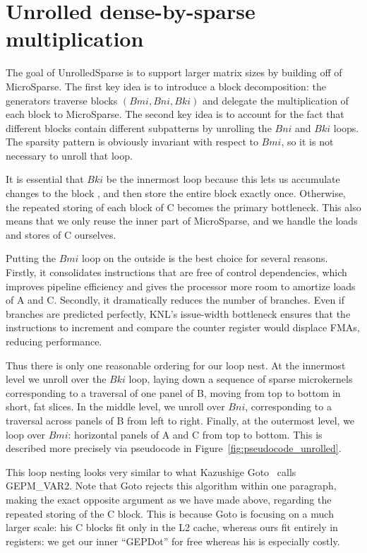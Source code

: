 \section{Unrolled dense-by-sparse multiplication}


The goal of UnrolledSparse is to support larger matrix sizes by building off of MicroSparse. The first key idea is to introduce a block decomposition: the generators traverse blocks $(Bmi, Bni, Bki)$ and delegate the multiplication of each block to MicroSparse. The second key idea is to account for the fact that different blocks contain different subpatterns by unrolling the $Bni$ and $Bki$ loops. The sparsity pattern is obviously invariant with respect to $Bmi$, so it is not necessary to unroll that loop. 

It is essential that $Bki$ be the innermost loop because this lets us accumulate changes to the block , and then store the entire block exactly once. Otherwise, the repeated storing of each block of C becomes the primary bottleneck. This also means that we only reuse the inner part of MicroSparse, and we handle the loads and stores of C ourselves.

Putting the $Bmi$ loop on the outside is the best choice for several reasons. Firstly, it consolidates instructions that are free of control dependencies, which improves pipeline efficiency and gives the processor more room to amortize loads of A and C. Secondly, it dramatically reduces the number of branches. Even if branches are predicted perfectly, KNL's issue-width bottleneck ensures that the instructions to increment and compare the counter register would displace FMAs, reducing performance.

Thus there is only one reasonable ordering for our loop nest. At the innermost level we unroll over the $Bki$ loop, laying down a sequence of sparse microkernels corresponding to a traversal of one panel of B, moving from top to bottom in short, fat slices. In the middle level, we unroll over $Bni$, corresponding to a traversal across panels of B from left to right. Finally, at the outermost level, we loop over $Bmi$: horizontal panels of A and C from top to bottom. This is described more precisely via pseudocode in Figure~\ref{fig:pseudocode_unrolled}.

This loop nesting looks very similar to what Kazushige Goto~\cite{Goto:2008:AHM:1356052.1356053} calls GEPM\_VAR2. Note that Goto rejects this algorithm within one paragraph, making the exact opposite argument as we have made above, regarding the repeated storing of the C block. This is because Goto is focusing on a much larger scale: his C blocks fit only in the L2 cache, whereas ours fit entirely in registers: we get our inner ``GEPDot'' for free whereas his is especially costly.

